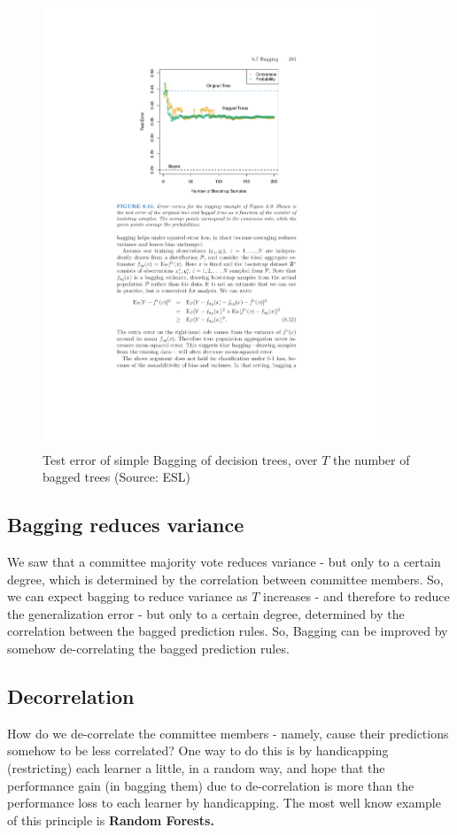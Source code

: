 \begin{figure}[H]
  \centering
  \includegraphics[width=4in]{bagging_trees.pdf}
  \caption{Test error of simple Bagging of decision trees, over $T$ the number
    of bagged trees (Source: ESL)}
\end{figure}


\subsection{Bagging reduces variance}

We saw that a committee majority vote reduces variance - but only to a certain
degree, which is determined by the correlation between committee members. So, we
can expect bagging to reduce variance as $T$ increases - and therefore to reduce
the generalization error - but only to a certain degree, determined by the
correlation between the bagged prediction rules. So, Bagging can be improved by
somehow de-correlating the bagged prediction rules.

\subsection{Decorrelation}

How do we de-correlate the committee
members - namely, cause their predictions somehow to be less correlated? One way to
do this is by handicapping (restricting) each learner a little, in a random way, and hope that
the performance gain (in bagging them) due to de-correlation is more than the
performance loss to each learner by handicapping. The most well know example of
this principle is {\bf Random Forests.}




